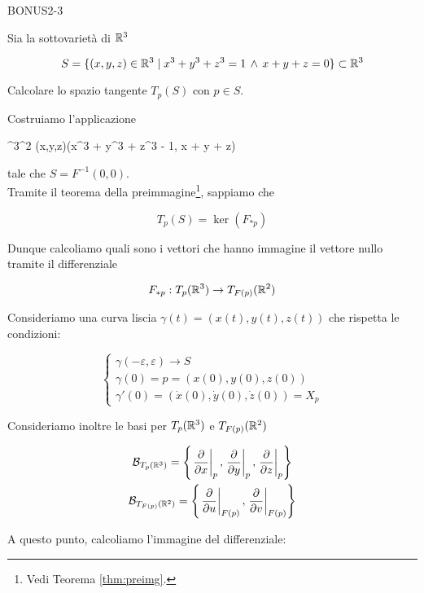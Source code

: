 {BONUS2-3}
{
Sia la sottovarietà di $ \mathbb{R}^{3} $

\begin{equation}
	S = \{ (x,y,z) \in \mathbb{R}^{3} \mid x^{3} + y^{3} + z^{3} = 1 \, \wedge \, x + y + z = 0 \} \subset \mathbb{R}^{3}
\end{equation}

Calcolare lo spazio tangente $ T_{p}(S) $ con $ p \in S $.
}
{
Costruiamo l'applicazione

	{\R^{3}}{\R^{2}}
	{(x,y,z)}{(x^{3} + y^{3} + z^{3} - 1, x + y + z)}

tale che $ S = F^{-1}(0,0) $. \\
Tramite il teorema della preimmagine\footnote{%
	Vedi Teorema \ref{thm:preimg}.%
}, sappiamo che

\begin{equation}
	T_{p}(S) = \ker(F_{*p})
\end{equation}

Dunque calcoliamo quali sono i vettori che hanno immagine il vettore nullo tramite il differenziale

\begin{equation}
	F_{*p} : T_{p}(\mathbb{R}^{3}) \to T_{F(p)}(\mathbb{R}^{2})
\end{equation}

Consideriamo una curva liscia $ \gamma (t) = (x(t), y(t), z(t)) $ che rispetta le condizioni:

\begin{equation}
	\begin{cases}
		\gamma (- \varepsilon, \varepsilon) \to S \\
		\gamma (0) = p = (x(0), y(0), z(0)) \\
		\gamma' (0) = (\dot{x}(0), \dot{y}(0), \dot{z}(0)) = X_{p}
	\end{cases}
\end{equation}

Consideriamo inoltre le basi per $ T_{p}(\mathbb{R}^{3}) $ e $ T_{F(p)}(\mathbb{R}^{2}) $

\begin{gather}
	\B_{T_{p}(\R^{3})} = \left\{ \eval{ \pdv{x} }_{p}, \eval{ \pdv{y} }_{p}, \eval{ \pdv{z} }_{p} \right\} \\
	\B_{T_{F(p)}(\R^{2})} = \left\{ \eval{ \pdv{u} }_{F(p)}, \eval{ \pdv{v} }_{F(p)} \right\}
\end{gather}

A questo punto, calcoliamo l'immagine del differenziale:

}
